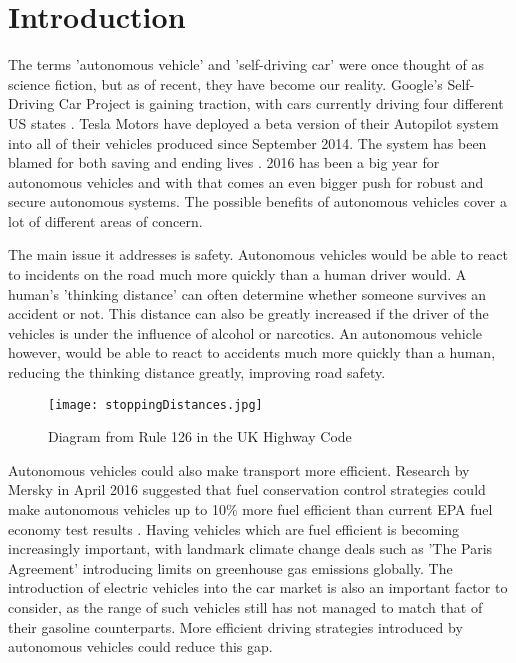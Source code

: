 \chapter{Introduction}
\label{cha:Introduction}

The terms 'autonomous vehicle' and 'self-driving car' were once thought of as science fiction, but as of recent, they have become our reality. Google's Self-Driving Car Project is gaining traction, with cars currently driving four different US states \citep{GoogleCars}. Tesla Motors have deployed a beta version of their Autopilot system into all of their vehicles produced since September 2014. The system has been blamed for both saving and ending lives \citep{TeslaHospital} \citep{TeslaUnderInvestigation}. 2016 has been a big year for autonomous vehicles and with that comes an even bigger push for robust and secure autonomous systems.
The possible benefits of autonomous vehicles cover a lot of different areas of concern. 

The main issue it addresses is safety. Autonomous vehicles would be able to react to incidents on the road much more quickly than a human driver would. A human's 'thinking distance' can often determine whether someone survives an accident or not. This distance can also be greatly increased if the driver of the vehicles is under the influence of alcohol or narcotics. An autonomous vehicle however, would be able to react to accidents much more quickly than a human, reducing the thinking distance greatly, improving road safety.

\begin{figure}[h]
\texttt{[image: stoppingDistances.jpg]}
\caption{Diagram from Rule 126 in the UK Highway Code \citep{StoppingDistances}}
\end{figure}

Autonomous vehicles could also make transport more efficient. Research by Mersky in April 2016 suggested that fuel conservation control strategies could make autonomous vehicles up to 10\% more fuel efficient than current EPA fuel economy test results \citep{Mersky2016} . Having vehicles which are fuel efficient is becoming increasingly important, with landmark climate change deals such as 'The Paris Agreement' introducing limits on greenhouse gas emissions globally. The introduction of electric vehicles into the car market is also an important factor to consider, as the range of such vehicles still has not managed to match that of their gasoline counterparts. More efficient driving strategies introduced by autonomous vehicles could reduce this gap.

